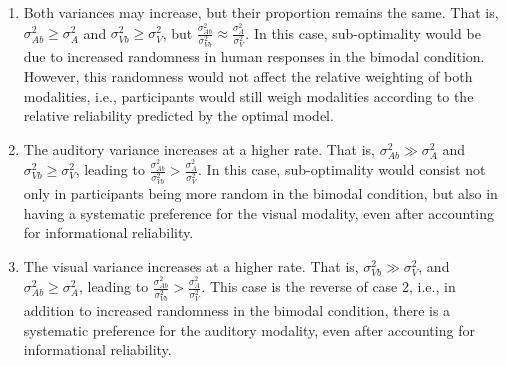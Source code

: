 \documentclass[english,,man,floatsintext]{apa6}
\theoremstyle{definition}
\theoremstyle{definition}
\theoremstyle{definition}
\theoremstyle{remark}
\begin{document}
\begin{enumerate}
\def\labelenumi{\arabic{enumi})}
\item
  Both variances may increase, but their proportion remains the same.
  That is, \(\sigma^2_{Ab} \geqslant \sigma^2_{A}\) and
  \(\sigma^2_{Vb} \geqslant \sigma^2_{V}\), but
  \(\frac{\sigma^2_{Ab}}{\sigma^2_{Vb}} \approx \frac{\sigma^2_{A}}{\sigma^2_{V}}\).
  In this case, sub-optimality would be due to increased randomness in
  human responses in the bimodal condition. However, this randomness
  would not affect the relative weighting of both modalities, i.e.,
  participants would still weigh modalities according to the relative
  reliability predicted by the optimal model.
\item
  The auditory variance increases at a higher rate. That is,
  \(\sigma^2_{Ab} \gg \sigma^2_{A}\) and
  \(\sigma^2_{Vb} \geqslant \sigma^2_{V}\), leading to
  \(\frac{\sigma^2_{Ab}}{\sigma^2_{Vb}} > \frac{\sigma^2_{A}}{\sigma^2_{V}}\).
  In this case, sub-optimality would consist not only in participants
  being more random in the bimodal condition, but also in having a
  systematic preference for the visual modality, even after accounting
  for informational reliability.
\item
  The visual variance increases at a higher rate. That is,
  \(\sigma^2_{Vb} \gg \sigma^2_{V}\), and
  \(\sigma^2_{Ab} \geqslant \sigma^2_{A}\), leading to
  \(\frac{\sigma^2_{Ab}}{\sigma^2_{Vb}} > \frac{\sigma^2_{A}}{\sigma^2_{V}}\).
  This case is the reverse of case 2, i.e., in addition to increased
  randomness in the bimodal condition, there is a systematic preference
  for the auditory modality, even after accounting for informational
  reliability.
\end{enumerate}
\end{document}
